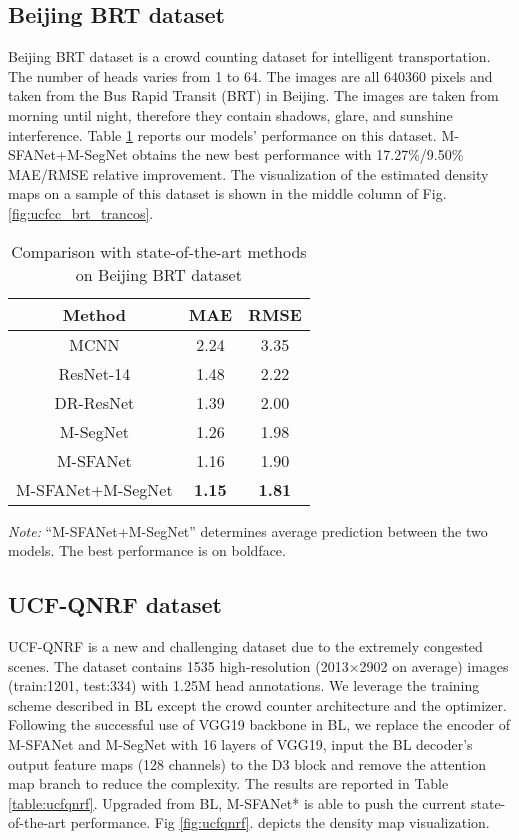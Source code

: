 \documentclass[10pt, conference, a4paper]{IEEEtran}
\begin{document}
\subsection{Beijing BRT dataset}
Beijing BRT dataset \cite{ding2018deeply} is a crowd counting dataset for intelligent transportation. The number of heads varies from 1 to 64. The images are all 640360 pixels and taken from the Bus Rapid Transit (BRT) in Beijing. The images are taken from morning until night, therefore they contain shadows, glare, and sunshine interference. Table \ref{table:brtres} reports our models' performance on this dataset. M-SFANet+M-SegNet obtains the new best performance with 17.27\%/9.50\% MAE/RMSE relative improvement. The visualization of the estimated density maps on a sample of this dataset is shown in the middle column of Fig. \ref{fig:ucfcc_brt_trancos}.

\setlength{\tabcolsep}{4pt}
\begin{table}
\begin{center}
\caption{Comparison with state-of-the-art methods on Beijing BRT \cite{ding2018deeply} dataset}
\begin{tabular}{c|c|c}
\hline
Method & MAE & RMSE\\
\hline
MCNN \cite{zhang2016single} & 2.24 & 3.35\\
ResNet-14 \cite{ding2018deeply} & 1.48 & 2.22\\
DR-ResNet \cite{ding2018deeply} & 1.39 & 2.00\\
\hline
M-SegNet & 1.26 & 1.98\\
M-SFANet & 1.16 & 1.90\\
M-SFANet+M-SegNet & \textbf{1.15} & \textbf{1.81}\\
\hline
\end{tabular}
\label{table:brtres}
\end{center}
\footnotesize\emph{Note:} ``M-SFANet+M-SegNet'' determines average prediction between the two models. The best performance is on boldface.
\end{table}
\setlength{\tabcolsep}{1.4pt} 
\subsection{UCF-QNRF dataset}
UCF-QNRF \cite{idrees2018composition} is a new and challenging dataset due to the extremely congested scenes. The dataset contains 1535 high-resolution (2013×2902 on average) images (train:1201, test:334) with 1.25M head annotations. We leverage the training scheme described in BL \cite{ma2019bayesian} except the crowd counter architecture and the optimizer. Following the successful use of VGG19 \cite{simonyan2014very} backbone in BL, we replace the encoder of M-SFANet and M-SegNet with 16 layers of VGG19, input the BL decoder's output feature maps (128 channels) to the D3 block and remove the attention map branch to reduce the complexity. The results are reported in Table \ref{table:ucfqnrf}. Upgraded from BL, M-SFANet* is able to push the current state-of-the-art performance. Fig \ref{fig:ucfqnrf}. depicts the density map visualization.
\label{ucfqnrf_section}
\end{document}

